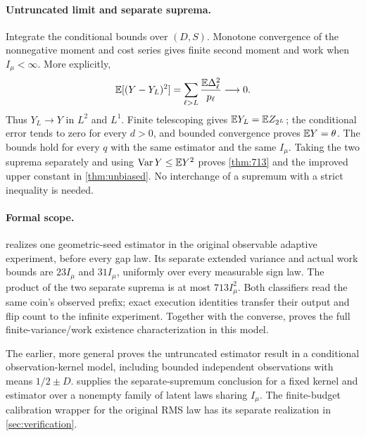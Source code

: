 \paragraph{Untruncated limit and separate suprema.}
Integrate the conditional bounds over $(D,S)$. Monotone convergence of
the nonnegative moment and cost series gives finite second moment and
work when $I_\mu<\infty$. More explicitly,
\[
 \mathbb E[(Y-Y_L)^2]=\sum_{\ell>L}\frac{\mathbb E\Delta_\ell^2}{p_\ell}
       \longrightarrow0.
\]
Thus $Y_L\to Y$ in $L^2$ and $L^1$. Finite telescoping gives
$\mathbb E Y_L=\mathbb E Z_{2^L}$; the conditional error tends to zero for every
$d>0$, and bounded convergence proves $\mathbb E Y=\theta$.
The bounds hold for every $q$ with the same estimator and the same
$I_\mu$. Taking the two suprema separately and using
$\operatorname{Var} Y\le\mathbb E Y^2$ proves \cref{thm:713} and the improved upper
constant in \cref{thm:unbiased}. No interchange of a supremum with a
strict inequality is needed.

\paragraph{Formal scope.}
 realizes one geometric-seed estimator
in the original observable adaptive experiment, before every gap law.
Its separate extended variance and actual work bounds are $23I_\mu$ and
$31I_\mu$, uniformly over every measurable sign law. The product of the
two separate suprema is at most $713I_\mu^2$. Both classifiers read the
same coin's observed prefix; exact execution identities transfer their
output and flip count to the infinite experiment. Together with the
converse,  proves the full
finite-variance/work existence characterization in this model.

The earlier, more general
 proves the
untruncated estimator result in a conditional observation-kernel model,
including bounded independent observations with means $1/2\pm D$.
supplies the separate-supremum conclusion for a fixed kernel and
estimator over a nonempty family of latent laws sharing $I_\mu$.
The finite-budget calibration wrapper for the original RMS law has its
separate realization in \cref{sec:verification}.
